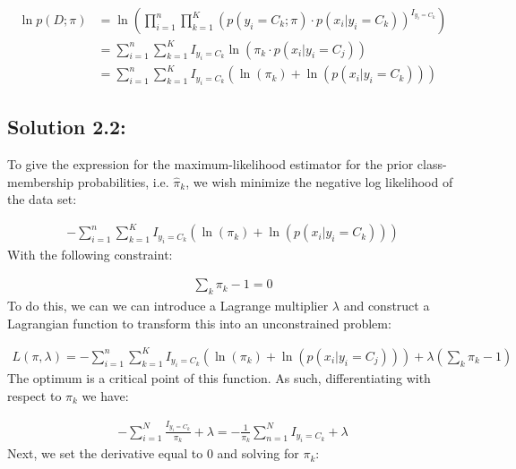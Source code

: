 \documentclass[submit]{harvardml}
\begin{document}
\begin{align*}
    \ln p(D; \pi) &= \ln \left(\prod_{i=1}^n \prod_{k=1}^K (p(y_i = C_k; \pi) \cdot p(x_i | y_i = C_k))^{I_{y_i=C_k}}\right) \\
    &= \sum_{i=1}^n \sum_{k=1}^K I_{y_i=C_k}\ln (\pi_k \cdot p(x_i | y_i = C_j)) \\
    &= \sum_{i=1}^n \sum_{k=1}^K I_{y_i=C_k}\left( \ln(\pi_k) + \ln(p(x_i | y_i = C_k)) \right)
\end{align*}
\subsection*{Solution 2.2:}

To give the expression for the maximum-likelihood estimator for the prior
class-membership probabilities, i.e. $\hat \pi_k$, we wish minimize the negative log likelihood of the data set:

\begin{align*}
    - \sum_{i=1}^n \sum_{k=1}^K I_{y_i=C_k}\left( \ln(\pi_k) + \ln(p(x_i | y_i = C_k)) \right)
\end{align*}
With the following constraint:

\begin{align*}
    \sum_k\pi_k - 1 = 0
\end{align*}
To do this, we can we can introduce a Lagrange multiplier $\lambda$ and construct a Lagrangian function to transform this into an unconstrained problem:

\begin{align*}
    L(\pi, \lambda) = - \sum_{i=1}^n \sum_{k=1}^K I_{y_i=C_k}\left( \ln(\pi_k) + \ln(p(x_i | y_i = C_j)) \right) + \lambda(\sum_k\pi_k - 1)
\end{align*}
The optimum is a critical point of this function. As such, differentiating with respect to $\pi_k$ we have:

\begin{align*}
    - \sum_{i=1}^{N} \frac{I_{y_i=C_k}}{\pi_k}+\lambda = -\frac{1}{\pi_k}\sum_{n=1}^{N} I_{y_i=C_k} + \lambda 
\end{align*}
Next, we set the derivative equal to $0$ and solving for $\pi_k$:
\end{document}
